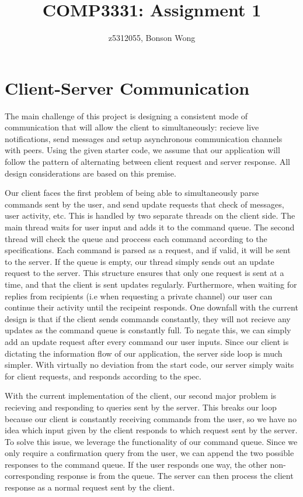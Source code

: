 \documentclass[12pt, ]{article}
\title{COMP3331: Assignment 1}
\author{z5312055, Bonson Wong}
\begin{document}
\maketitle
\section{Client-Server Communication}

\begin{flushleft}
	The main challenge of this project is designing a consistent mode of communication that will allow the client to simultaneously: recieve live notifications, send messages and setup asynchronous communication channels with peers. 
	Using the given starter code, we assume that our application will follow the pattern of alternating between client request and server response. 
	All design considerations are based on this premise.
\end{flushleft}

\begin{flushleft}
	Our client faces the first problem of being able to simultaneously parse commands sent by the user, and send update requests that check of messages, user activity, etc.
	This is handled by two separate threads on the client side. The main thread waits for user input and adds it to the command queue. 
	The second thread will check the queue and proccess each command according to the specifications. Each command is parsed as a request, and if valid, it will be sent to the server.
	If the queue is empty, our thread simply sends out an update request to the server.
	This structure ensures that only one request is sent at a time, and that the client is sent updates regularly.
	Furthermore, when waiting for replies from recipients (i.e when requesting a private channel) our user can continue their activity until the recipeint responds.
	One downfall with the current design is that if the client sends commands constantly, they will not recieve any updates as the command queue is constantly full.
	To negate this, we can simply add an update request after every command our user inputs.
	Since our client is dictating the information flow of our application, the server side loop is much simpler. With virtually no deviation from the start code, our server simply waits for client requests, and responds according to the spec.
\end{flushleft}

\begin{flushleft}
	With the current implementation of the client, our second major problem is recieving and responding to queries sent by the server. 
	This breaks our loop because our client is constantly receiving commands from the user, so we have no idea which input given by the client responds to which request sent by the server. 
	To solve this issue, we leverage the functionality of our command queue. Since we only require a confirmation query from the user, we can append the two possible responses to the command queue.
	If the user responds one way, the other non-corresponding response is from the queue.
	The server can then process the client response as a normal request sent by the client.
\end{flushleft}
\end{document}
